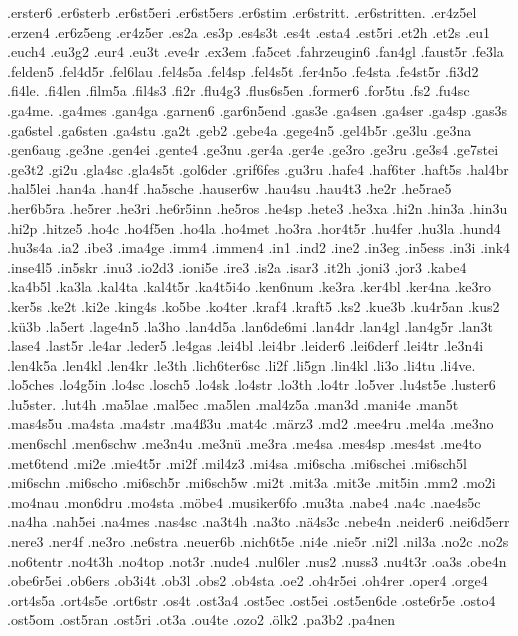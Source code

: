 {.erster6
.er6sterb
.er6st5eri
.er6st5ers
.er6stim
.er6stritt.
.er6stritten.
.er4z5el
.erzen4
.er6z5eng
.er4z5er
.es2a
.es3p
.es4s3t
.es4t
.esta4
.est5ri
.et2h
.et2s
.eu1
.euch4
.eu3g2
.eur4
.eu3t
.eve4r
.ex3em
.fa5cet
.fahrzeugin6
.fan4gl
.faust5r
.fe3la
.felden5
.fel4d5r
.fel6lau
.fel4s5a
.fel4sp
.fel4s5t
.fer4n5o
.fe4sta
.fe4st5r
.fi3d2
.fi4le.
.fi4len
.film5a
.fil4s3
.fi2r
.flu4g3
.flus6s5en
.former6
.for5tu
.fs2
.fu4sc
.ga4me.
.ga4mes
.gan4ga
.garnen6
.gar6n5end
.gas3e
.ga4sen
.ga4ser
.ga4sp
.gas3s
.ga6stel
.ga6sten
.ga4stu
.ga2t
.geb2
.gebe4a
.gege4n5
.gel4b5r
.ge3lu
.ge3na
.gen6aug
.ge3ne
.gen4ei
.gente4
.ge3nu
.ger4a
.ger4e
.ge3ro
.ge3ru
.ge3s4
.ge7stei
.ge3t2
.gi2u
.gla4sc
.gla4s5t
.gol6der
.grif6fes
.gu3ru
.hafe4
.haf6ter
.haft5s
.hal4br
.hal5lei
.han4a
.han4f
.ha5sche
.hauser6w
.hau4su
.hau4t3
.he2r
.he5rae5
.her6b5ra
.he5rer
.he3ri
.he6r5inn
.he5ros
.he4sp
.hete3
.he3xa
.hi2n
.hin3a
.hin3u
.hi2p
.hitze5
.ho4c
.ho4f5en
.ho4la
.ho4met
.ho3ra
.hor4t5r
.hu4fer
.hu3la
.hund4
.hu3s4a
.ia2
.ibe3
.ima4ge
.imm4
.immen4
.in1
.ind2
.ine2
.in3eg
.in5ess
.in3i
.ink4
.inse4l5
.in5skr
.inu3
.io2d3
.ioni5e
.ire3
.is2a
.isar3
.it2h
.joni3
.jor3
.kabe4
.ka4b5l
.ka3la
.kal4ta
.kal4t5r
.ka4t5i4o
.ken6num
.ke3ra
.ker4bl
.ker4na
.ke3ro
.ker5s
.ke2t
.ki2e
.king4s
.ko5be
.ko4ter
.kraf4
.kraft5
.ks2
.kue3b
.ku4r5an
.kus2
.kü3b
.la5ert
.lage4n5
.la3ho
.lan4d5a
.lan6de6mi
.lan4dr
.lan4gl
.lan4g5r
.lan3t
.lase4
.last5r
.le4ar
.leder5
.le4gas
.lei4bl
.lei4br
.leider6
.lei6derf
.lei4tr
.le3n4i
.len4k5a
.len4kl
.len4kr
.le3th
.lich6ter6sc
.li2f
.li5gn
.lin4kl
.li3o
.li4tu
.li4ve.
.lo5ches
.lo4g5in
.lo4sc
.losch5
.lo4sk
.lo4str
.lo3th
.lo4tr
.lo5ver
.lu4st5e
.luster6
.lu5ster.
.lut4h
.ma5lae
.mal5ec
.ma5len
.mal4z5a
.man3d
.mani4e
.man5t
.mas4s5u
.ma4sta
.ma4str
.ma4ß3u
.mat4c
.märz3
.md2
.mee4ru
.mel4a
.me3no
.men6schl
.men6schw
.me3n4u
.me3nü
.me3ra
.me4sa
.mes4sp
.mes4st
.me4to
.met6tend
.mi2e
.mie4t5r
.mi2f
.mil4z3
.mi4sa
.mi6scha
.mi6schei
.mi6sch5l
.mi6schn
.mi6scho
.mi6sch5r
.mi6sch5w
.mi2t
.mit3a
.mit3e
.mit5in
.mm2
.mo2i
.mo4nau
.mon6dru
.mo4sta
.möbe4
.musiker6fo
.mu3ta
.nabe4
.na4c
.nae4s5c
.na4ha
.nah5ei
.na4mes
.nas4sc
.na3t4h
.na3to
.nä4s3c
.nebe4n
.neider6
.nei6d5err
.nere3
.ner4f
.ne3ro
.ne6stra
.neuer6b
.nich6t5e
.ni4e
.nie5r
.ni2l
.nil3a
.no2c
.no2s
.no6tentr
.no4t3h
.no4top
.not3r
.nude4
.nul6ler
.nus2
.nuss3
.nu4t3r
.oa3s
.obe4n
.obe6r5ei
.ob6ers
.ob3i4t
.ob3l
.obs2
.ob4sta
.oe2
.oh4r5ei
.oh4rer
.oper4
.orge4
.ort4s5a
.ort4s5e
.ort6str
.os4t
.ost3a4
.ost5ec
.ost5ei
.ost5en6de
.oste6r5e
.osto4
.ost5om
.ost5ran
.ost5ri
.ot3a
.ou4te
.ozo2
.ölk2
.pa3b2
.pa4nen
}
